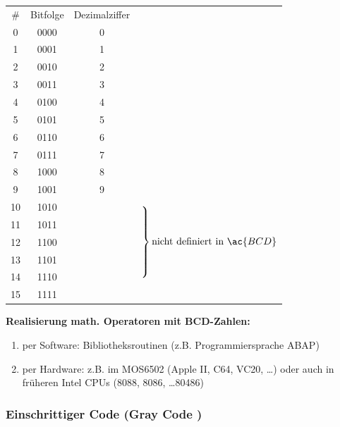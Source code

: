 \documentclass[10pt,a4paper]{scrartcl}
\begin{document}
\begin{minipage}{0.45\textwidth}
	\begin{tabular}{c|c|cl}
	\# & Bitfolge & Dezimalziffer\\
	0 & 0000 & 0& \\
	1 & 0001 & 1& \\
	2 & 0010 & 2& \\
	3 & 0011 & 3& \\
	4 & 0100 & 4& \\
	5 & 0101 & 5& \\
	6 & 0110 & 6& \\
	7 & 0111 & 7& \\
	8 & 1000 & 8& \\
	9 & 1001 & 9& \\
	10 & 1010 & &  \multirow{5}{*}{\hspace*{-2em}$\begin{rcases*} \\ \\ \\ \\ \\ \end{rcases*} \text{nicht definiert in } \ac{BCD}$}\\
	11 & 1011 & & \\
	12 & 1100 & & \\
	13 & 1101 & & \\
	14 & 1110 & & \\
	15 & 1111 & & \\
\end{tabular}
\end{minipage}
\begin{minipage}{0.45\textwidth}
\textbf{	Realisierung math. Operatoren mit \ac{BCD}-Zahlen:\\}
	\begin{enumerate}
		\itemsep0em
		\vspace{-2em}
		\item per Software: Bibliotheksroutinen (z.B. Programmiersprache ABAP)
		\item per Hardware: z.B. im MOS6502 (Apple II, C64, VC20, \ldots) oder auch in früheren Intel CPUs (8088, 8086, \ldots 80486)
	\end{enumerate}



\end{minipage}

\subsubsection{Einschrittiger Code (Gray Code )}
\end{document}
